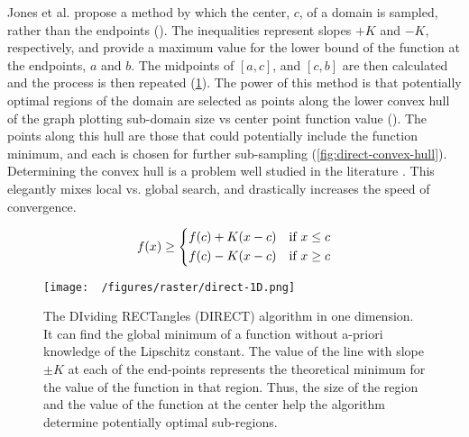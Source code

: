 Jones et al. \cite{jonesLipschitzianOptimizationLipschitz1993} propose a method by which the center, $c$, of a domain is sampled, rather than the endpoints ().
The inequalities represent slopes $+K$ and $-K$, respectively, and provide a maximum value for the lower bound of the function at the endpoints, $a$ and $b$.
The midpoints of $[a,c]$, and $[c,b]$ are then calculated and the process is then repeated (\cref{fig:direct-1D}).
The power of this method is that potentially optimal regions of the domain are selected as points along the lower convex hull of the graph plotting sub-domain size vs center point function value ().
The points along this hull are those that could potentially include the function minimum, and each is chosen for further sub-sampling (\cref{fig:direct-convex-hull}).
Determining the convex hull is a problem well studied in the literature \cite{barberQuickhullAlgorithmConvex1996,chanOptimalOutputsensitiveConvex1996,jarvisIdentificationConvexHull1973,grahamEfficientAlgorithDetermining1972}.
This elegantly mixes local vs. global search, and drastically increases the speed of convergence.


\begin{equation}
    f(x) \ge \begin{dcases}
        f(c) + K(x-c) & \text{if  } x \le c \\
        f(c) - K(x-c) & \text{if  } x \ge c
    \end{dcases}
    \label{eq:direct-lipschitz}
\end{equation}

\begin{figure}[h!]
    \begin{center}
        \texttt{[image: ~/figures/raster/direct-1D.png]}
    \end{center}
    \caption[The DIviding RECTangles (DIRECT) algorithm in one dimension]{The DIviding RECTangles (DIRECT) algorithm in one dimension. It can find the global minimum of a function without a-priori knowledge of the Lipschitz constant. The value of the line with slope $\pm K$ at each of the end-points represents the theoretical minimum for the value of the function in that region. Thus, the size of the region and the value of the function at the center help the algorithm determine potentially optimal sub-regions.}
    \label{fig:direct-1D}
\end{figure}

